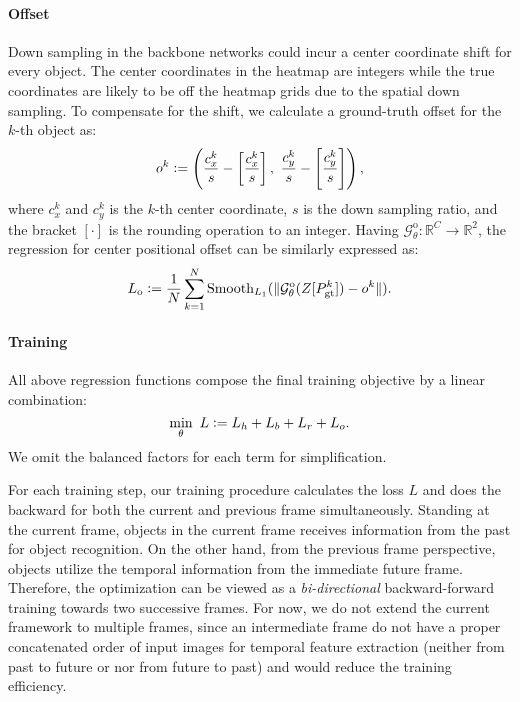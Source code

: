 \documentclass[10pt,twocolumn,letterpaper]{article}
\newcommand{\RR}{\mathbb{R}}
\newcommand{\defeq}{\vcentcolon=}
\begin{document}
\paragraph{Offset} Down sampling in the backbone networks could incur a center coordinate shift for every object. The center coordinates in the heatmap are integers while the true coordinates are likely to be off the heatmap grids due to the spatial down sampling. To compensate for the shift, we calculate a ground-truth offset for the $k$-th object as:
\begin{equation}
    o^k \defeq \left(\frac{c_x^k}{s} - \left[\frac{c_x^k}{s}\right],\ \frac{c_y^k}{s} - \left[\frac{c_y^k}{s} \right] \right),
\end{equation}
where $c_x^k$ and $c_y^k$ is the $k$-th center coordinate, $s$ is the down sampling ratio, and the bracket $[\cdot]$ is the rounding operation to an integer. Having $\mathcal{G}_\theta^{\text{o}}: \RR^C \rightarrow \RR^2$, the regression for center positional offset can be similarly expressed as:
\begin{equation}
    L_\text{o} \defeq \frac{1}{N}\sum_{k=1}^{N} \text{Smooth}_{L_1}(\lVert \mathcal{G}_\theta^\text{o}(Z[P_{\text{gt}}^k]) - o^k \rVert).
\end{equation}

\vspace{-6mm}
\paragraph{Training} All above regression functions compose the final training objective by a linear combination:
\begin{equation}
    \min_\theta\  L \defeq L_h + L_b + L_r + L_o.
\end{equation}
We omit the balanced factors for each term for simplification.

For each training step, our training procedure calculates the loss $L$ and does the backward for both the current and previous frame simultaneously. Standing at the current frame, objects in the current frame receives information from the past for object recognition. On the other hand, from the previous frame perspective, objects utilize the temporal information from the immediate future frame. Therefore, the optimization can be viewed as a \textit{bi-directional} backward-forward training towards two successive frames. For now, we do not extend the current framework to multiple frames, since an intermediate frame do not have a proper concatenated order of input images for temporal feature extraction (neither from past to future or nor from future to past) and would reduce the training efficiency.
\end{document}
